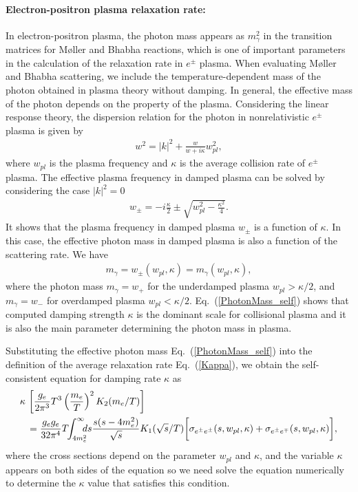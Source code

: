 \paragraph{Electron-positron plasma relaxation rate:}
In electron-positron plasma, the photon mass appears as $m_\gamma^2$ in the transition matrices for M{\o}ller and Bhabha reactions, which is one of important parameters in the calculation of the relaxation rate in $e^\pm$ plasma. When evaluating M{\o}ller and Bhabha scattering, we include the temperature-dependent mass of the photon obtained in plasma theory without damping. In general, the effective mass of the photon depends on the property of the plasma. Considering the linear response theory, the dispersion relation for the photon in nonrelativistic $e^\pm$ plasma is given by~\cite{Formanek:2021blc}
\begin{align}\label{dispersion_damping}
w^2=|k|^2+\frac{w}{w+i\kappa}w_{pl}^2,
\end{align}
where $w_{pl}$ is the plasma frequency and $\kappa$ is the average collision rate of $e^\pm$ plasma. The effective plasma frequency in damped plasma can be solved by considering the case $|k|^2=0$~\cite{Formanek:2021blc}
\begin{align}\label{plasmafrequency_damped}
w_{\pm}=-i\frac{\kappa}{2}\pm\sqrt{w^2_{pl}-\frac{\kappa^2}{4}}.
\end{align}
It shows that the plasma frequency in damped plasma $w_\pm$ is a function of $\kappa.$  In this case, the effective photon mass in damped plasma is also a function of the scattering rate. We have
\begin{align}\label{PhotonMass_self}
m_\gamma=w_\pm(w_{pl},\kappa)=m_\gamma(w_{pl},\kappa),
\end{align}
where the photon mass $m_\gamma=w_+$ for the underdamped plasma $w_{pl}>\kappa/2$, and $m_\gamma=w_-$ for overdamped plasma $w_{pl}<\kappa/2$. Eq.~(\ref{PhotonMass_self}) shows that computed damping strength $\kappa$ is the dominant scale for collisional plasma and it is also the main parameter determining the photon mass in plasma. 

Substituting the effective photon mass Eq.~(\ref{PhotonMass_self}) into the definition of the average relaxation rate Eq.~(\ref{Kappa}), we obtain the self-consistent equation for damping rate $\kappa$ as 
\begin{align}\label{RealaxtionSelf}
\kappa\,&\left[\frac{g_e}{2\pi^3}T^3\left(\frac{m_e}{T}\right)^2K_2(m_e/T)\right]\notag\\&=\frac{g_eg_e}{32\pi^4}T\!\!\int_{4m_e^2}^\infty\!\!\!\!ds\frac{s(s-4m^2_e)}{\sqrt{s}}K_1(\sqrt{s}/T)
\bigg[\sigma_{e^\pm e^\pm}(s,w_{pl},\kappa)+\sigma_{e^\pm e^\mp}(s,w_{pl},\kappa)\bigg],
\end{align}
where the cross sections depend on the parameter $w_{pl}$ and $\kappa$, and the variable $\kappa$ appears on both sides of the equation so we need solve the equation numerically to determine the $\kappa$ value that satisfies this condition.

